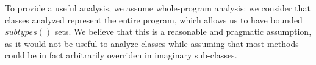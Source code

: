 To provide a useful analysis, we assume whole-program analysis: we
consider that classes analyzed represent the entire program, which allows us to
have bounded $subtypes()$ sets. We believe that this is a reasonable and
pragmatic assumption, as it would not be useful to analyze classes while
assuming that most methods could be in fact arbitrarily overriden in imaginary
sub-classes.
